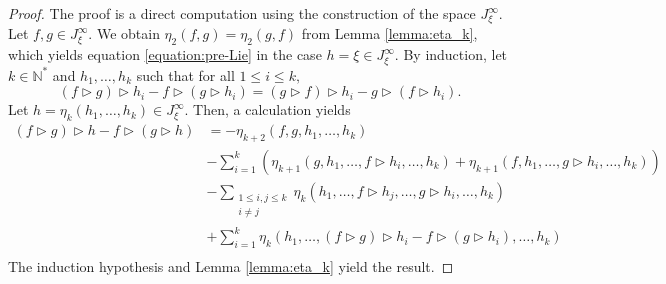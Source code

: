 \documentclass[10pt,a4paper]{amsart}
\begin{document}
\begin{proof}
The proof is a direct computation using the construction of the space $J_\xi^\infty.$ Let $f,g \in J_\xi^\infty.$ We obtain $\eta_2(f,g) = \eta_2(g,f)$ from Lemma \ref{lemma:eta_k}, which yields equation \eqref{equation:pre-Lie} in the case $h=\xi \in J_\xi^\infty.$
By induction, let $k \in \mathbb{N}^*$ and $h_1, \ldots, h_k$ such that for all $1 \leq i \leq k,$
\[
(f\triangleright g)\triangleright h_i-f\triangleright (g\triangleright h_i)=(g\triangleright f)\triangleright h_i-g\triangleright (f\triangleright h_i).
\]
Let $h=\eta_k(h_1, \ldots, h_k) \in J_\xi^\infty.$ Then, a calculation yields
\begin{align*}
(f\triangleright g)\triangleright h-f\triangleright (g\triangleright h)
&=-\eta_{k+2}(f, g, h_1, \ldots,  h_k)
\\
&-\sum\limits_{i=1}^k (\eta_{k+1}(g, h_1, \ldots, f \triangleright h_i, \ldots, h_k) + \eta_{k+1}(f, h_1, \ldots, g \triangleright h_i, \ldots, h_k))\\
&-\sum\limits_{\substack{1 \leq i,j \leq k \\ i \neq j} } \eta_k(h_1, \ldots, f \triangleright h_j, \ldots, g \triangleright h_i, \ldots, h_k)\\
&+\sum\limits_{i=1}^k \eta_k(h_1, \ldots, (f \triangleright g) \triangleright h_i-f \triangleright (g \triangleright h_i) , \ldots, h_k)\\
\end{align*}
The induction hypothesis and Lemma \ref{lemma:eta_k} yield the result.
\end{proof}
\end{document}
